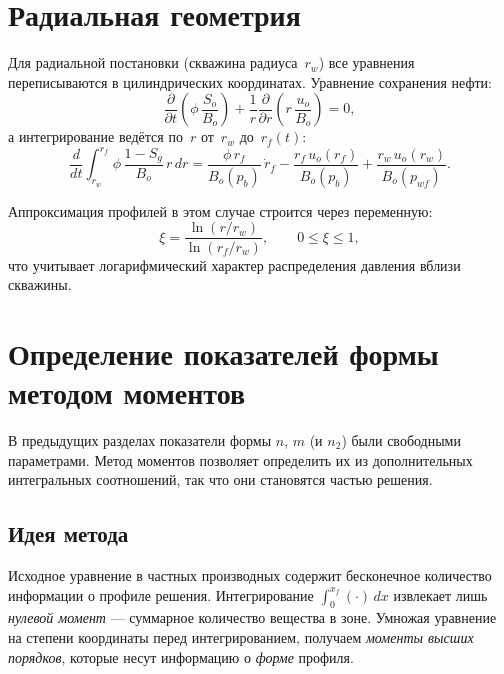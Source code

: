\documentclass[12pt,a4paper]{article}
\begin{document}
\section{Радиальная геометрия}

Для радиальной постановки (скважина радиуса~$r_w$) все уравнения
переписываются в цилиндрических координатах. Уравнение сохранения
нефти:
\begin{equation}\label{eq:oil_radial}
  \frac{\partial}{\partial t}\left(\phi\,\frac{S_o}{B_o}\right)
  + \frac{1}{r}\frac{\partial}{\partial r}
  \left(r\,\frac{u_o}{B_o}\right) = 0,
\end{equation}
а интегрирование ведётся по~$r$ от~$r_w$ до~$r_f(t)$:
\begin{equation}\label{eq:oil_integral_radial}
  \frac{d}{dt}\int_{r_w}^{r_f}
  \phi\,\frac{1-S_g}{B_o}\,r\,dr
  = \frac{\phi\,r_f}{B_o(p_b)}\,\dot{r}_f
  - \frac{r_f\,u_o(r_f)}{B_o(p_b)}
  + \frac{r_w\,u_o(r_w)}{B_o(p_{wf})}.
\end{equation}

Аппроксимация профилей в этом случае строится через переменную:
\begin{equation}
  \xi = \frac{\ln(r/r_w)}{\ln(r_f/r_w)}, \qquad 0 \le \xi \le 1,
\end{equation}
что учитывает логарифмический характер распределения давления
вблизи скважины.

\section{Определение показателей формы методом моментов}

В предыдущих разделах показатели формы $n$, $m$ (и $n_2$) были
свободными параметрами. Метод моментов позволяет определить их
из дополнительных интегральных соотношений, так что они становятся
частью решения.

\subsection{Идея метода}

Исходное уравнение в частных производных содержит бесконечное
количество информации о профиле решения. Интегрирование
$\int_0^{x_f}(\cdot)\,dx$ извлекает лишь \emph{нулевой момент} ---
суммарное количество вещества в зоне. Умножая уравнение на степени
координаты перед интегрированием, получаем \emph{моменты высших
порядков}, которые несут информацию о \emph{форме} профиля.
\end{document}
